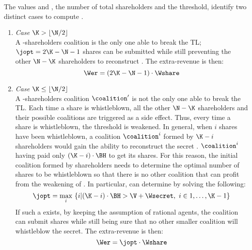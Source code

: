The values \N and \K, the number of total shareholders and the threshold, identify two distinct cases to compute  \jopt.
\begin{enumerate}
	\item {\em Case $\K > \lfloor \N/2 \rfloor $ }\\
	A \K-shareholders coalition \coalition is the only one able to break the TL; $\jopt = 2\K-\N-1$ shares can be submitted while still preventing the other $\N-\K$ shareholders to reconstruct \secret. 
	The extra-revenue is then:
	$$ \Wer = \left( 2\K - \N - 1 \right) \cdot \Wshare$$
	\item {\em Case $ \K \le \lfloor \N/2 \rfloor $}\\
	A \K-shareholders coalition $\coalition^\prime$ is not the only one able to break the TL. 
	Each time a share is whistleblown, all the other $\N-\K$ shareholders and their possible coalitions are triggered as a side effect.
	Thus, every time a share is whistleblown, the threshold \K is weakened. 
	In general, when $i$ shares have been whistleblown, a coalition $\coalition^i$ formed by $\K-i$ shareholders would gain the ability to reconstruct the secret \secret. $\coalition^i$ having paid only $(\K-i) \cdot \BH$ to get its shares. 
	For this reason, the initial coalition \coalition formed by \K shareholders needs to determine the optimal number of shares \jopt to be whistleblown so that there is no other coalition that can profit from the weakening of \K. In particular, \coalition can determine \jopt by solving the following:
	$$\jopt = \operatorname*{max}_i\ \{i | (\K-i) \cdot \BH > \V + \Wsecret,\ i \in 1,\ldots,\K-1 \}$$
	If such a \jopt exists, by keeping the assumption of rational agents, the coalition \coalition can submit \jopt shares while still being sure that no other smaller coalition will whistleblow the secret.
	The extra-revenue is then:
	$$ \Wer = \jopt \cdot \Wshare$$
	 
\end{enumerate} 

